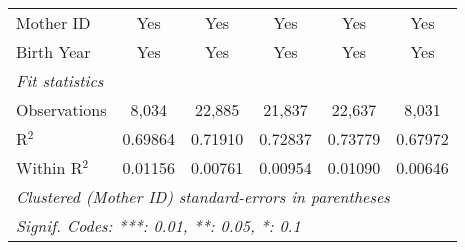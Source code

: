 \documentclass{article}
\begin{document}
\begin{landscape}
\begin{tabular}{lccccc}
   Mother ID            & Yes                    & Yes            & Yes             & Yes            & Yes\\  
   Birth Year           & Yes                    & Yes            & Yes             & Yes            & Yes\\  
   \midrule
   \emph{Fit statistics}\\
   Observations         & 8,034                  & 22,885         & 21,837          & 22,637         & 8,031\\  
   R$^2$                & 0.69864                & 0.71910        & 0.72837         & 0.73779        & 0.67972\\  
   Within R$^2$         & 0.01156                & 0.00761        & 0.00954         & 0.01090        & 0.00646\\  
   \midrule \midrule
   \multicolumn{6}{l}{\emph{Clustered (Mother ID) standard-errors in parentheses}}\\
   \multicolumn{6}{l}{\emph{Signif. Codes: ***: 0.01, **: 0.05, *: 0.1}}\\
\end{tabular}
\par\endgroup


\end{landscape}
\end{document}

